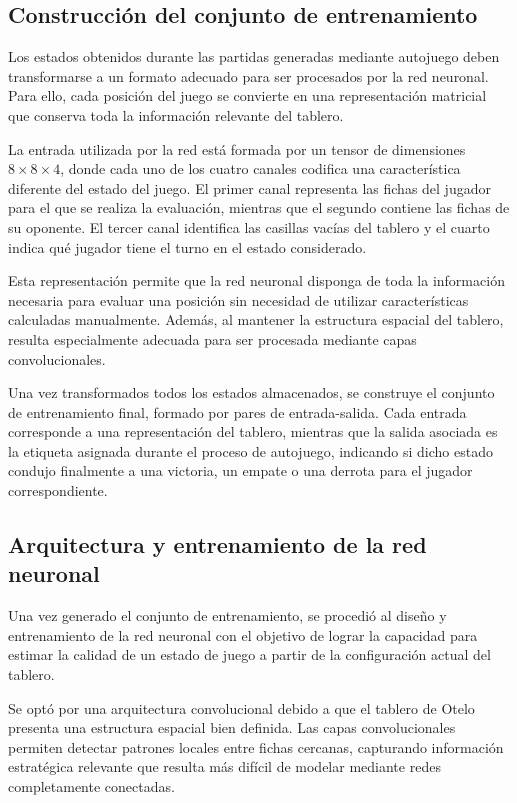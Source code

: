 \documentclass[conference,a4paper]{IEEEtran}
\begin{document}
\subsection{Construcción del conjunto de entrenamiento} 
Los estados obtenidos durante las partidas generadas mediante autojuego deben transformarse a un formato adecuado para ser procesados por la red neuronal. 
Para ello, cada posición del juego se convierte en una representación matricial que conserva toda la información relevante del tablero. 

La entrada utilizada por la red está formada por un tensor de dimensiones $8\times8\times4$, donde cada uno de los cuatro canales codifica una característica diferente del estado del juego. 
El primer canal representa las fichas del jugador para el que se realiza la evaluación, mientras que el segundo contiene las fichas de su oponente. 
El tercer canal identifica las casillas vacías del tablero y el cuarto indica qué jugador tiene el turno en el estado considerado. 

Esta representación permite que la red neuronal disponga de toda la información necesaria para evaluar una posición sin necesidad de utilizar características calculadas manualmente. 
Además, al mantener la estructura espacial del tablero, resulta especialmente adecuada para ser procesada mediante capas convolucionales. 

Una vez transformados todos los estados almacenados, se construye el conjunto de entrenamiento final, formado por pares de entrada-salida. 
Cada entrada corresponde a una representación del tablero, mientras que la salida asociada es la etiqueta asignada durante el proceso de autojuego, indicando si dicho estado condujo finalmente a una victoria, un empate o una derrota para el jugador correspondiente. 

\subsection{Arquitectura y entrenamiento de la red neuronal} 
Una vez generado el conjunto de entrenamiento, se procedió al diseño y entrenamiento de la red neuronal con el objetivo de lograr la capacidad para estimar la calidad de un estado de juego a partir de la configuración actual del tablero. 

Se optó por una arquitectura convolucional debido a que el tablero de Otelo presenta una estructura espacial bien definida. 
Las capas convolucionales permiten detectar patrones locales entre fichas cercanas, capturando información estratégica relevante que resulta más difícil de modelar mediante redes completamente conectadas. 
\end{document}
